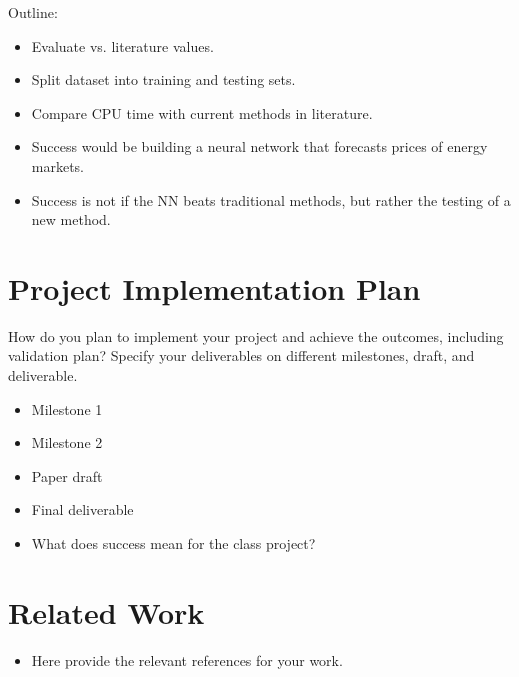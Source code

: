 \documentclass[sigconf]{acmart}
\begin{document}
Outline:
\begin{itemize}
    \item Evaluate vs. literature values.
    \item Split dataset into training and testing sets.
    \item Compare CPU time with current methods in literature.
    \item Success would be building a neural network that forecasts prices of energy markets. 
    \item Success is not if the NN beats traditional methods, but rather the testing of a new method. 
\end{itemize}


\section{Project Implementation Plan}
How do you plan to implement your project and achieve the outcomes, including validation plan? Specify your deliverables on different milestones, draft, and deliverable. 


\begin{itemize}
    \item Milestone 1 
    \item Milestone 2 
	\item Paper draft 
	\item Final deliverable 
    \item What does success mean for the class project?
\end{itemize}


\section{Related Work}
\begin{itemize}
    \item Here provide the relevant references for your work. 
\end{itemize}
	
\end{document}
